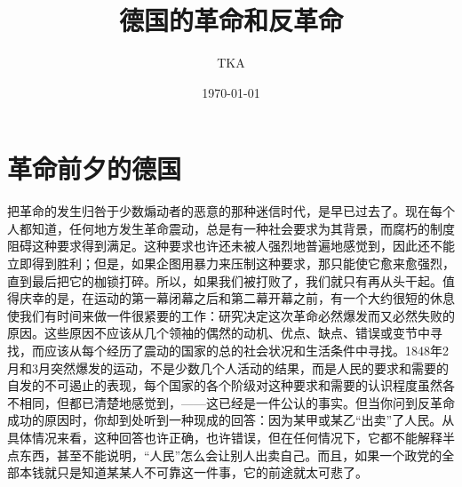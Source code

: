 \documentclass[a4paper]{article}
\title{\heiti\zihao{2} 德国的革命和反革命}
\author{TKA}
\date{\today}
\begin{document}
    \maketitle

    \tableofcontents

    \part{革命前夕的德国}


    把革命的发生归咎于少数煽动者的恶意的那种迷信时代，是早已过去了。现在每个人都知道，任何地方发生革命震动，总是有一种社会要求为其背景，而腐朽的制度阻碍这种要求得到满足。这种要求也许还未被人强烈地普遍地感觉到，因此还不能立即得到胜利；但是，如果企图用暴力来压制这种要求，那只能使它愈来愈强烈，直到最后把它的枷锁打碎。所以，如果我们被打败了，我们就只有再从头干起。值得庆幸的是，在运动的第一幕闭幕之后和第二幕开幕之前，有一个大约很短的休息使我们有时间来做一件很紧要的工作：研究决定这次革命必然爆发而又必然失败的原因。这些原因不应该从几个领袖的偶然的动机、优点、缺点、错误或变节中寻找，而应该从每个经历了震动的国家的总的社会状况和生活条件中寻找。1848年2月和3月突然爆发的运动，不是少数几个人活动的结果，而是人民的要求和需要的自发的不可遏止的表现，每个国家的各个阶级对这种要求和需要的认识程度虽然各不相同，但都已清楚地感觉到，——这已经是一件公认的事实。但当你问到反革命成功的原因时，你却到处听到一种现成的回答：因为某甲或某乙“出卖”了人民。从具体情况来看，这种回答也许正确，也许错误，但在任何情况下，它都不能解释半点东西，甚至不能说明，``人民''怎么会让别人出卖自己。而且，如果一个政党的全部本钱就只是知道某某人不可靠这一件事，它的前途就太可悲了。
\end{document}
